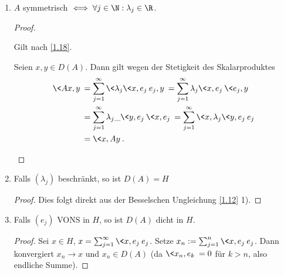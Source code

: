\documentclass{mycourse}
\begin{document}
\begin{ex}
\begin{enumerate}[1)]
\begin{enumerate}[a)]
\begin{proof}
\begin{align*}
							&= \Big\< \sum_{j=1}^\infty \lambda_j \<x,e_j\> e_j, e_k \Big\> \\
							&= \lambda_k \<x,e_k\> \<e_k, e_k\>
							= \lambda_k \<x,e_k\>. 
							\end{align*}
						Damit gilt $ (\lambda-\lambda_k)\<x,e_k\>=0, \lambda\neq \lambda_k $ und $ \<x,e_k\>=0 $ für alle $ k\in \N $. Dies impliziert $ x=0 $ oder zumindest	 $Ax = \sum_{j=1}^\infty \lambda_j \<x,e_j\> e_j = 0$.
						Damit sind alle Eigenwerte von $A$ gegeben durch
						\[
							\{ \lambda_j : j \in \N \} \quad \text{oder}\quad \{\lambda_j : j \in \N\} \cup \{0\}.
						\]
					\end{proof}
			\end{enumerate}
		\item
			$A$ symmetrisch $\iff \forall j \in \N : \lambda_j \in \R$.
			\begin{proof}
				\begin{seg}[$\implies$]
					Gilt nach \ref{1.18}.
				\end{seg}
				\begin{seg}[$\Longleftarrow$]
					Seien $x,y \in D(A)$. Dann gilt wegen der Stetigkeit des Skalarproduktes
					\begin{align*}
						\<Ax,y\>
						&= \sum_{j=1}^\infty \<\lambda_j \<x,e_j\> e_j, y\> 
						= \sum_{j=1}^\infty \lambda_j \<x,e_j\> \<e_j, y\> \\
						&= \sum_{j=1}^\infty \lambda_j \_{\<y,e_j\>} \<x, e_j\> 
						= \sum_{j=1}^\infty \<x,\lambda_j \<y,e_j\> e_j\> \\
						&= \<x, Ay\>.
					\end{align*}
				\end{seg}
			\end{proof}
		\item
			Falls $(\lambda_j)$ beschränkt, so ist $D(A) = H$
			\begin{proof}
				Dies folgt direkt aus der Besselschen Ungleichung \ref{1.12} 1).
			\end{proof}
		\item
			Falls $(e_j)$ VONS in $H$, so ist $D(A)$ dicht in $H$.
			\begin{proof}
				Sei $x \in H$, $x = \sum_{j=1}^\infty \<x,e_j\> e_j$.
				Setze $x_n := \sum_{j=1}^n \<x,e_j\> e_j$.
				Dann konvergiert $x_n \to x$ und $x_n \in D(A)$ (da $\<x_n,e_k\> = 0$ für $k > n$, also endliche Summe).
			\end{proof}
	\end{enumerate}
\end{ex}
\end{document}
